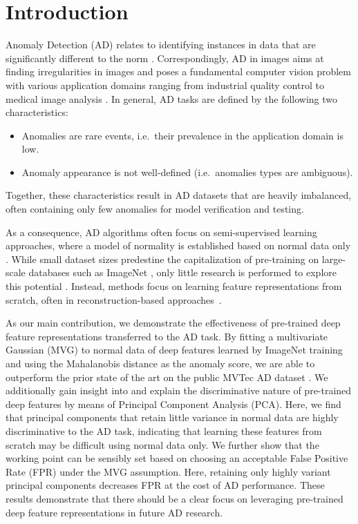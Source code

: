 \documentclass[conference, a4paper]{./template/IEEEtran}
\begin{document}
\section{Introduction}
Anomaly Detection (AD) relates to identifying instances in data that are significantly different to the norm \cite{Chandola2009,Pimentel2014}.
Correspondingly, AD in images aims at finding irregularities in images and poses a fundamental computer vision problem with various application domains ranging from industrial quality control \cite{Bergmann2019} to medical image analysis \cite{Schlegl2019}. 
In general, AD tasks are defined by the following two characteristics:
\begin{itemize}
  \item Anomalies are rare events, i.e.\ their prevalence in the application domain is low.
\item Anomaly appearance is not well-defined (i.e.\ anomalies types are ambiguous).
\end{itemize}
Together, these characteristics result in AD datasets that are heavily imbalanced, often containing only few anomalies for model verification and testing.

As a consequence, AD algorithms often focus on semi-supervised learning approaches, where a model of normality is established based on normal data only \cite{Bergmann2019, Schlegl2019, Ruff2018}.
While small dataset sizes predestine the capitalization of pre-training on large-scale databases such as ImageNet \cite{Deng2009}, only little research is performed to explore this potential \cite{Napoletano2018, Andrews2016, Cohen2020}.
Instead, methods focus on learning feature representations from scratch, often in reconstruction-based approaches~\cite{Gong2019, Schlegl2019}.

As our main contribution, we demonstrate the effectiveness of pre-trained deep feature representations transferred to the AD task. By fitting a multivariate Gaussian (MVG) to normal data of deep features learned by ImageNet training and using the Mahalanobis distance \cite{Mahalanobis1936} as the anomaly score, we are able to outperform the prior state of the art on the public MVTec AD dataset \cite{Bergmann2019}.
We additionally gain insight into and explain the discriminative nature of pre-trained deep features by means of Principal Component Analysis (PCA).
Here, we find that principal components that retain little variance in normal data are highly discriminative to the AD task, indicating that learning these features from scratch may be difficult using normal data only.
We further show that the working point can be sensibly set based on choosing an acceptable False Positive Rate (FPR) under the MVG assumption. Here, retaining only highly variant principal components decreases FPR at the cost of AD performance. These results demonstrate that there should be a clear focus on leveraging pre-trained deep feature representations in future AD research.
\end{document}
